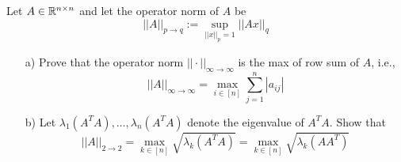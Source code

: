 \documentclass{ExerciseSheet}
\begin{document}
\fi

\vskip 0.5cm
\begin{exo}
Let $A \in \mathbb{R}^{n\times n}$ and let the operator norm of $A$ be
\begin{equation*}
||A||_{p\to q}:= \sup_{||x||_p=1} ||Ax||_q
\end{equation*}
\begin{enumerate}
	\item[a)] Prove that the operator norm $||\cdot||_{\infty\to \infty}$ is the max of row sum of $A$, i.e.,
	\begin{equation*}
		||A||_{\infty\to \infty}= \max_{i \in [n]} \sum_{j=1}^{n}|a_{ij}|
	\end{equation*}

\item[b)] Let $\lambda_1(A^TA), \dots, \lambda_n(A^TA)$ denote the eigenvalue of $A^TA$. Show that
\begin{equation*}
	||A||_{2\to 2}= \max_{k \in [n]} \sqrt{\lambda_k(A^TA)} = \max_{k \in [n]} \sqrt{\lambda_k(AA^T)} 
\end{equation*}
\end{enumerate}
\end{exo}
\end{document}
